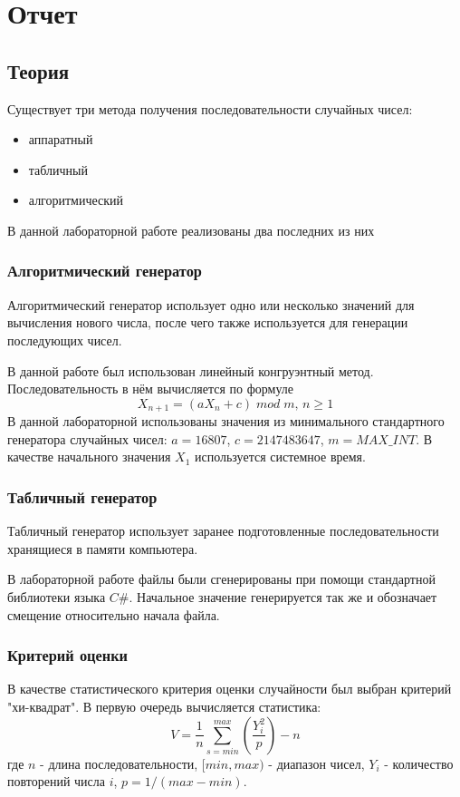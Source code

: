 \chapter{Отчет}
\section{Теория}
Существует три метода получения последовательности случайных чисел:
\begin{itemize}
	\item аппаратный
	\item табличный
	\item алгоритмический
\end{itemize}
В данной лабораторной работе реализованы два последних из них

\subsection{Алгоритмический генератор}
Алгоритмический генератор использует одно или несколько значений для вычисления нового числа, после чего также используется для генерации последующих чисел.  

В данной работе был использован линейный конгруэнтный метод. Последовательность в нём вычисляется по формуле
\begin{equation}
	X_{n+1} = (aX_n + c)\;mod\;m,\,n \ge 1
\end{equation}
В данной лабораторной использованы значения из минимального стандартного генератора случайных чисел: $a = 16807$, $c = 2147483647$, $m = {MAX\_INT}$. 
В качестве начального значения $X_1$ используется системное время.

\subsection{Табличный генератор}
Табличный генератор использует заранее подготовленные последовательности хранящиеся в памяти компьютера. 

В лабораторной работе файлы были сгенерированы при помощи стандартной библиотеки языка $C\#$. Начальное значение генерируется так же и обозначает смещение относительно начала файла.

\subsection{Критерий оценки}
В качестве статистического критерия оценки случайности был выбран критерий "хи-квадрат". В первую очередь вычисляется статистика:
\begin{equation}
	V = \frac{1}{n} \sum^{max}_{s=min}(\dfrac{Y^2_i}{p}) - n
\end{equation}
где $n$ - длина последовательности, $[min, max)$ - диапазон чисел, $Y_i$ - количество повторений числа $i$, $p=1/(max-min)$.

